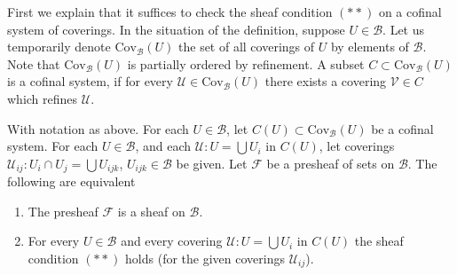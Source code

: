 \noindent
First we explain that it suffices to
check the sheaf condition $(**)$
on a cofinal system of coverings.
In the situation of the definition, suppose
$U \in \mathcal{B}$. Let us temporarily denote
$\text{Cov}_{\mathcal{B}}(U)$ the set of all coverings
of $U$ by elements of $\mathcal{B}$.
Note that $\text{Cov}_{\mathcal{B}}(U)$
is partially ordered by refinement.
A subset $C \subset \text{Cov}_{\mathcal{B}}(U)$ is a
cofinal system, if for every $\mathcal{U} \in \text{Cov}_{\mathcal{B}}(U)$
there exists a covering $\mathcal{V} \in C$ which refines $\mathcal{U}$.

\begin{lemma}
\label{lemma-cofinal-systems-coverings}
With notation as above.
For each $U \in \mathcal{B}$, let $C(U) \subset \text{Cov}_{\mathcal{B}}(U)$
be a cofinal system. For each $U \in \mathcal{B}$, and each
$\mathcal{U} : U = \bigcup U_i$ in $C(U)$, let coverings
$\mathcal{U}_{ij} : U_i \cap U_j = \bigcup U_{ijk}$,
$U_{ijk} \in \mathcal{B}$ be given.
Let $\mathcal{F}$ be a presheaf of sets on $\mathcal{B}$.
The following are equivalent
\begin{enumerate}
\item The presheaf $\mathcal{F}$ is a sheaf on $\mathcal{B}$.
\item For every $U \in \mathcal{B}$ and every covering
$\mathcal{U} : U = \bigcup U_i$ in $C(U)$ the sheaf condition
$(**)$ holds (for the given coverings $\mathcal{U}_{ij}$).
\end{enumerate}
\end{lemma}

